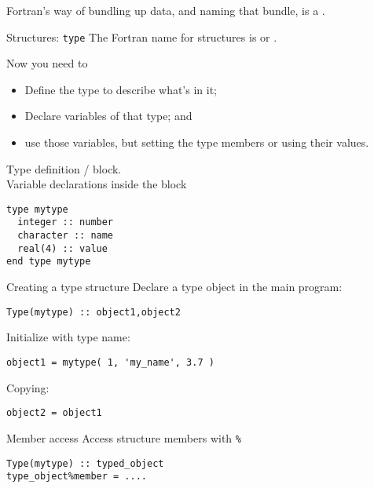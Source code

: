 
Fortran's way of bundling up data, and naming that bundle, is a
.

\begin{slide}{Structures: \noexpand\texttt{type}}
  \label{sl:ftype}
  The Fortran name for structures is  or
  .
\end{slide}

Now you need to
\begin{itemize}
\item Define the type to describe what's in it;
\item Declare variables of that type; and
\item use those variables, but setting the type members or using their
  values.
\end{itemize}

\begin{block}{Type definition}
  \label{sl:ftype-def}
   /  block.\\
  Variable declarations inside the block
\begin{verbatim}
type mytype
  integer :: number
  character :: name
  real(4) :: value
end type mytype
\end{verbatim}
\end{block}

\begin{block}{Creating a type structure}
  \label{sl:ftype-set}
  Declare a type object in the main program:
\begin{verbatim}
Type(mytype) :: object1,object2
\end{verbatim}
 Initialize with type name:
\begin{verbatim}
object1 = mytype( 1, 'my_name', 3.7 )
\end{verbatim}
Copying:
\begin{verbatim}
object2 = object1
\end{verbatim}

\end{block}

\begin{block}{Member access}
  \label{sl:ftype-access}
  Access structure members with \verb+%+
\begin{verbatim}
Type(mytype) :: typed_object
type_object%member = ....  
\end{verbatim}
\end{block}

